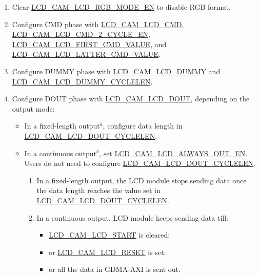 \documentclass[main\_\_EN.tex]{subfiles}
\begin{document}
\begin{enumerate}
    \item Clear \hyperref[fielddesc:LCDCAMLCDRGBMODEEN]{LCD\_CAM\_LCD\_RGB\_MODE\_EN} to disable RGB format.
    \item Configure CMD phase with \hyperref[fielddesc:LCDCAMLCDCMD]{LCD\_CAM\_LCD\_CMD}, \hyperref[fielddesc:LCDCAMLCDCMD2CYCLEEN]{LCD\_CAM\_LCD\_CMD\_2\_CYCLE\_EN}, \hyperref[fielddesc:LCDCAMLCDFIRSTCMDVALUE]{LCD\_CAM\_LCD\_FIRST\_CMD\_VALUE}, and \hyperref[fielddesc:LCDCAMLCDLATTERCMDVALUE]{LCD\_CAM\_LCD\_LATTER\_CMD\_VALUE}.
    \item Configure DUMMY phase with \hyperref[fielddesc:LCDCAMLCDDUMMY]{LCD\_CAM\_LCD\_DUMMY} and \hyperref[fielddesc:LCDCAMLCDDUMMYCYCLELEN]{LCD\_CAM\_LCD\_DUMMY\_CYCLELEN}.
    \item Configure DOUT phase with \hyperref[fielddesc:LCDCAMLCDDOUT]{LCD\_CAM\_LCD\_DOUT}, depending on the output mode:
    \begin{itemize}
        \item In a fixed-length output\hyperref[camlcdctrl-note-1]{$^a$}, configure data length in \hyperref[fielddesc:LCDCAMLCDDOUTCYCLELEN]{LCD\_CAM\_LCD\_DOUT\_CYCLELEN}.
        \item In a continuous output\hyperref[camlcdctrl-note-2]{$^b$}, set \hyperref[fielddesc:LCDCAMLCDALWAYSOUTEN]{LCD\_CAM\_LCD\_ALWAYS\_OUT\_EN}. Users do not need to configure \hyperref[fielddesc:LCDCAMLCDDOUTCYCLELEN]{LCD\_CAM\_LCD\_DOUT\_CYCLELEN}.
    \begin{tiplisting}
    \vspace{-2em}
    \begin{enumerate}
        \item \label{camlcdctrl-note-1} In a fixed-length output, the LCD module stops sending data once the data length reaches the value set in \hyperref[fielddesc:LCDCAMLCDDOUTCYCLELEN]{LCD\_CAM\_LCD\_DOUT\_CYCLELEN}.
        \item \label{camlcdctrl-note-2} In a continuous output, LCD module keeps sending data till:
            \begin{itemize}
                \item \hyperref[fielddesc:LCDCAMLCDSTART]{LCD\_CAM\_LCD\_START} is cleared;
                \item or \hyperref[fielddesc:LCDCAMLCDRESET]{LCD\_CAM\_LCD\_RESET} is set;
                \item or all the data in GDMA-AXI is sent out.
            \end{itemize}
    \end{enumerate}
    \end{tiplisting}
    \end{itemize}


\end{enumerate}
\end{document}
